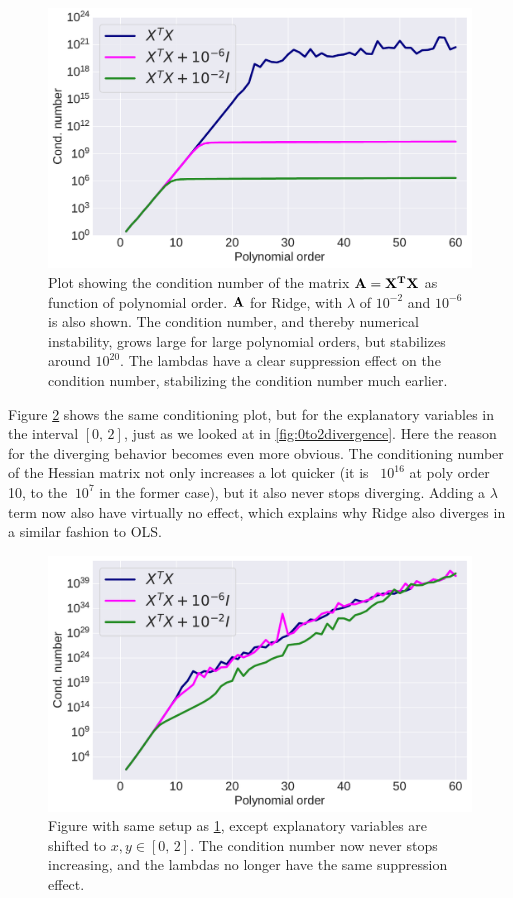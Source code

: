 \documentclass[10pt, twocolumn]{article}
\begin{document}
\begin{figure}[h!]
    \centering
    \includegraphics[scale=0.4]{../figs/cond.pdf}
    \caption{Plot showing the condition number of the matrix $\vb{A}=\vb{X^T}\vb{X}$ as function of polynomial order. $\vb{A}$ for Ridge, with $\lambda$ of $10^{-2}$ and $10^{-6}$ is also shown. The condition number, and thereby numerical instability, grows large for large polynomial orders, but stabilizes around $10^{20}$. The lambdas have a clear suppression effect on the condition number, stabilizing the condition number much earlier.}
    \label{fig:cond_num}
\end{figure}



Figure \cref{fig:cond_num2} shows the same conditioning plot, but for the explanatory variables in the interval $[0,\, 2]$, just as we looked at in \cref{fig:0to2divergence}. Here the reason for the diverging behavior becomes even more obvious. The conditioning number of the Hessian matrix not only increases a lot quicker (it is ~$10^{16}$ at poly order 10, to the $~10^{7}$ in the former case), but it also never stops diverging. Adding a $\lambda$ term now also have virtually no effect, which explains why Ridge also diverges in a similar fashion to OLS.

\begin{figure}[h!]
    \centering
    \includegraphics[scale=0.4]{../figs/cond_02.pdf}
    \caption{Figure with same setup as \cref{fig:cond_num}, except explanatory variables are shifted to $x,y \in [0,\, 2]$. The condition number now never stops increasing, and the lambdas no longer have the same suppression effect.}
    \label{fig:cond_num2}
\end{figure}
\end{document}
